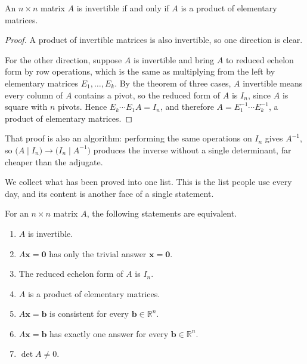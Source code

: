 \begin{teorema}
An $n\times n$ matrix $A$ is invertible if and only if $A$ is a product of elementary matrices.
\end{teorema}

\begin{proof}
A product of invertible matrices is also invertible, so one direction is clear.

For the other direction, suppose $A$ is invertible and bring $A$ to reduced echelon form by row
operations, which is the same as multiplying from the left by elementary matrices
$E_{1},\dots,E_{k}$. By the theorem of three cases, $A$ invertible means every column of $A$
contains a pivot, so the reduced form of $A$ is $I_{n}$, since $A$ is square with $n$ pivots.
Hence $E_{k}\cdots E_{1}A=I_{n}$, and therefore $A=E_{1}^{-1}\cdots E_{k}^{-1}$, a product of
elementary matrices.
\end{proof}

That proof is also an algorithm: performing the same operations on $I_{n}$ gives $A^{-1}$, so
$\bigl(A\mid I_{n}\bigr)\to\bigl(I_{n}\mid A^{-1}\bigr)$ produces the inverse without a single
determinant, far cheaper than the adjugate.

We collect what has been proved into one list. This is the list people use every day, and its
content is another face of a single statement.

\begin{teorema}
For an $n\times n$ matrix $A$, the following statements are equivalent.
\begin{enumerate}
  \item $A$ is invertible.
  \item $A\mathbf{x}=\mathbf{0}$ has only the trivial answer $\mathbf{x}=\mathbf{0}$.
  \item The reduced echelon form of $A$ is $I_{n}$.
  \item $A$ is a product of elementary matrices.
  \item $A\mathbf{x}=\mathbf{b}$ is consistent for every $\mathbf{b}\in\mathbb{R}^{n}$.
  \item $A\mathbf{x}=\mathbf{b}$ has exactly one answer for every $\mathbf{b}\in\mathbb{R}^{n}$.
  \item $\det A\neq0$.
\end{enumerate}
\end{teorema}

